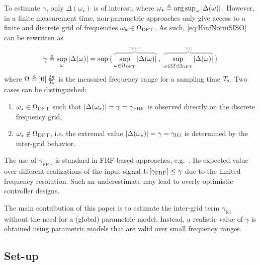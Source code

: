 To estimate $\gamma$, only $\Delta(\omega_{\star})$ is of interest, where
$ \omega_{\star} 
     \triangleq 
       \arg
         \sup_{\omega} 
           \left| \Delta(\omega) \right|
  \text{.}
  \label{eq:omega-star}
$
However, in a finite measurement time, non-parametric approaches only give access to a finite and discrete grid of frequencies $\omega_k \in \Omega_{\mathrm{DFT}}$.
As such, \eqref{eq:HinfNormSISO} can be rewritten as
\begin{equation}
  \gamma \isdef \sup_{\omega} \abs{\Delta(\omega)}
         = \sup 
             \set{
                \ezbrace{\sup_{\omega \in \DFTGrid  } \abs{\Delta(\omega)}}{\gamma_{\mathrm{FRF}}}
                \;,\;
                \ezbrace{
                \sup_{\omega \in \InterGrid} \abs{\Delta(\omega)}}{\gamma_{\mathrm{IG}}}}
  \label{eq:gamma-split-grid}
\end{equation}
where $\Omega \triangleq \left] 0 \right[{\frac{2\pi}{T_{\mathrm{s}}}}$ is the measured frequency range for a sampling time $T_{\mathrm{s}}$.
Two cases can be distinguished:
\begin{enumerate}
  \item $\omega_{\star} \in \Omega_{\mathrm{DFT}}$ such that $\left| \Delta(\omega_{\star}) \right| = \gamma =\gamma_{\mathrm{FRF}}$ is observed directly on the discrete frequency grid,
  \item $\omega_{\star} \not\in \Omega_{\mathrm{DFT}}$, i.e. the extremal value $\left| \Delta(\omega_{\star}) \right|  = \gamma = \gamma_{\mathrm{IG}}$ is determined by the inter-grid behavior.
\end{enumerate}
The use of $\gamma_{\mathrm{FRF}}$ is standard in \gls{FRF}-based approaches, e.g.~\citep{vandeWal2002}.
Its expected value over different realizations of the input signal $\operatorname{\mathrm{E}}_{} \left[ \gamma_{\mathrm{FRF}} \right] \leq \gamma$ due to the limited frequency resolution.
Such an underestimate may lead to overly optimistic controller designs.

The main contribution of this paper is to  estimate the inter-grid term $\gamma_{\mathrm{IG}}$ without the need for a (global) parametric model.
Instead, a  realistic value of $\gamma$ is obtained using parametric models that are valid over small frequency ranges.

\subsection{Set-up}


